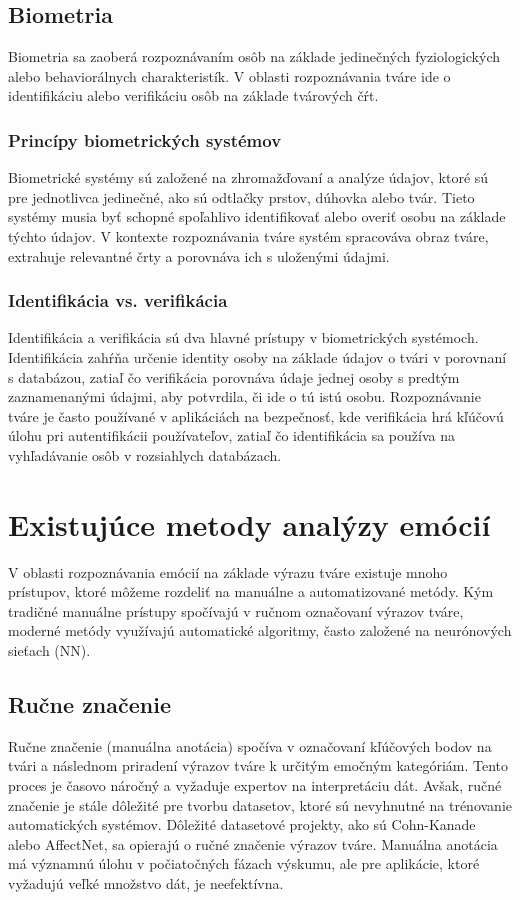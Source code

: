 \subsection{Biometria}
Biometria sa zaoberá rozpoznávaním osôb na základe jedinečných fyziologických alebo behaviorálnych charakteristík. V oblasti rozpoznávania tváre ide o identifikáciu alebo verifikáciu osôb 
na základe tvárových čŕt​. \cite{inProceedings01} \cite{article03}
\subsubsection{Princípy biometrických systémov}
Biometrické systémy sú založené na zhromažďovaní a analýze údajov, ktoré sú pre jednotlivca jedinečné, ako sú odtlačky prstov, dúhovka alebo tvár. Tieto systémy musia byť schopné spoľahlivo identifikovať 
alebo overiť osobu na základe týchto údajov. V kontexte rozpoznávania tváre systém spracováva obraz tváre, extrahuje relevantné črty a porovnáva ich s uloženými údajmi​. \cite{article01}
\subsubsection{Identifikácia vs. verifikácia}
Identifikácia a verifikácia sú dva hlavné prístupy v biometrických systémoch. Identifikácia zahŕňa určenie identity osoby na základe údajov o tvári v porovnaní s databázou, zatiaľ čo verifikácia porovnáva 
údaje jednej osoby s predtým zaznamenanými údajmi, aby potvrdila, či ide o tú istú osobu​\cite{inProceedings01}. Rozpoznávanie tváre je často používané v aplikáciách na bezpečnosť, kde verifikácia 
hrá kľúčovú úlohu pri autentifikácii používateľov, zatiaľ čo identifikácia sa používa na vyhľadávanie osôb v rozsiahlych databázach.\cite{article03}

\section{Existujúce metody analýzy emócií}
V oblasti rozpoznávania emócií na základe výrazu tváre existuje mnoho prístupov, ktoré môžeme rozdeliť na manuálne a automatizované metódy. Kým tradičné manuálne prístupy spočívajú v ručnom označovaní 
výrazov tváre, moderné metódy využívajú automatické algoritmy, často založené na neurónových sieťach (NN).

\subsection{Ručne značenie}
Ručne značenie (manuálna anotácia) spočíva v označovaní kľúčových bodov na tvári a následnom priradení výrazov tváre k určitým emočným kategóriám. Tento proces je časovo náročný a vyžaduje expertov 
na interpretáciu dát. Avšak, ručné značenie je stále dôležité pre tvorbu datasetov, ktoré sú nevyhnutné na trénovanie automatických systémov. Dôležité datasetové projekty, ako sú Cohn-Kanade alebo AffectNet, 
sa opierajú o ručné značenie výrazov tváre​. Manuálna anotácia má významnú úlohu v počiatočných fázach výskumu, ale pre aplikácie, ktoré vyžadujú veľké množstvo dát, je neefektívna. \cite{article01}

